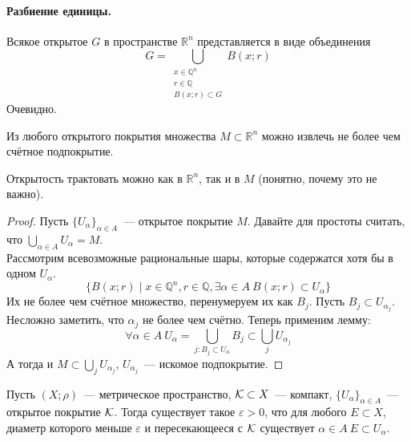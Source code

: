 \documentclass{article}
\let\eps\varepsilon
\begin{document}
    \paragraph{Разбиение единицы.}
    \begin{lemma}
        Всякое открытое $G$ в пространстве $\mathbb R^n$ представляется в виде объединения
        $$
        G=\bigcup\limits_{\substack{x\in\mathbb Q^n\\r\in\mathbb Q\\B(x;r)\subset G}}B(x;r)
        $$
        Очевидно.
    \end{lemma}
    \begin{theorem}
        Из любого открытого покрытия множества $M\subset\mathbb R^n$ можно извлечь не более чем счётное подпокрытие.
    \end{theorem}
    \begin{remark}
        Открытость трактовать можно как в $\mathbb R^n$, так и в $M$ (понятно, почему это не важно).
    \end{remark}
    \begin{proof}
        Пусть $\{U_\alpha\}_{\alpha\in A}$~--- открытое покрытие $M$. Давайте для простоты считать, что $\bigcup\limits_{\alpha\in A}U_\alpha=M$.\\
        Рассмотрим всевозможные рациональные шары, которые содержатся хотя бы в одном $U_\alpha$.
        $$
        \{B(x;r)\mid x\in\mathbb Q^n,r\in\mathbb Q,\exists\alpha\in A~B(x;r)\subset U_\alpha\}
        $$
        Их не более чем счётное множество, перенумеруем их как $B_j$. Пусть $B_j\subset U_{\alpha_j}$. Несложно заметить, что $\alpha_j$ не более чем счётно. Теперь применим лемму:
        $$
        \forall\alpha\in A~U_\alpha=\bigcup\limits_{j:B_j\subset U_\alpha}B_j\subset\bigcup\limits_jU_{\alpha_j}
        $$
        А тогда и $M\subset\bigcup\limits_jU_{\alpha_j}$, $U_{\alpha_j}$~--- искомое подпокрытие.
    \end{proof}
    \begin{lemma}
        Пусть $(X;\rho)$~--- метрическое пространство, ${\mathcal{K}}\subset X$~--- компакт, $\{U_\alpha\}_{\alpha\in A}$~--- открытое покрытие ${\mathcal{K}}$. Тогда существует такое $\eps>0$, что для любого $E\subset X$, диаметр которого меньше $\eps$ и пересекающееся с ${\mathcal{K}}$ существует $\alpha\in A~E\subset U_\alpha$.
    \end{lemma}
\end{document}
